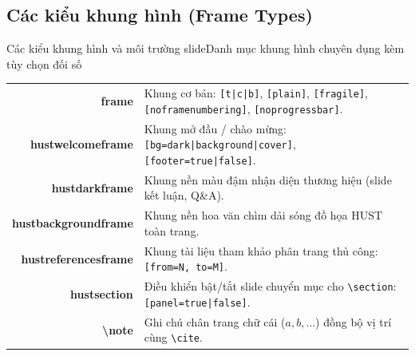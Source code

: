 \documentclass[aspectratio=169,10pt]{beamer}
\begin{document}
\subsection{Các kiểu khung hình (Frame Types)}
\begin{frame}{Các kiểu khung hình và môi trường slide}{Danh mục khung hình chuyên dụng kèm tùy chọn đối số}
  \scriptsize
  \centering
  \begin{tabularx}{\textwidth}{>{\ttfamily\bfseries\color{hustmain}}r >{\small}X}
    frame               & Khung cơ bản: \texttt{[t|c|b]}, \texttt{[plain]}, \texttt{[fragile]}, \texttt{[noframenumbering]}, \texttt{[noprogressbar]}. \\
    hustwelcomeframe    & Khung mở đầu / chào mừng: \texttt{[bg=dark|background|cover]}, \texttt{[footer=true|false]}. \\
    hustdarkframe       & Khung nền màu đậm nhận diện thương hiệu (slide kết luận, Q\&A). \\
    hustbackgroundframe & Khung nền hoa văn chìm dải sóng đồ họa HUST toàn trang. \\
    hustreferencesframe & Khung tài liệu tham khảo phân trang thủ công: \texttt{[from=N, to=M]}. \\
    hustsection         & Điều khiển bật/tắt slide chuyển mục cho \texttt{\textbackslash section}: \texttt{[panel=true|false]}. \\
    \textbackslash note & Ghi chú chân trang chữ cái ($a, b, \dots$) đồng bộ vị trí cùng \texttt{\textbackslash cite}. \\
  \end{tabularx}
\end{frame}
\end{document}
